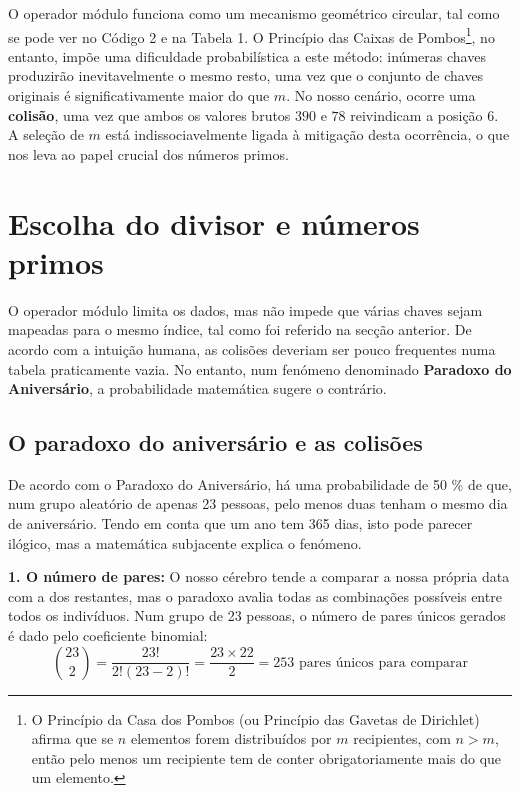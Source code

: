 \documentclass[12pt, a4paper]{article}
\begin{document}
O operador módulo funciona como um mecanismo geométrico circular, tal como se pode ver no 
Código 2 e na Tabela 1. O Princípio das Caixas de Pombos\footnote{O Princípio da Casa dos Pombos 
(ou Princípio das Gavetas de Dirichlet) afirma que se $n$ elementos forem distribuídos por $m$ recipientes, 
com $n > m$, então pelo menos um recipiente tem de conter obrigatoriamente mais do que um elemento.}, no entanto, 
impõe uma dificuldade probabilística a este método: inúmeras chaves produzirão inevitavelmente o mesmo resto, uma 
vez que o conjunto de chaves originais é significativamente maior do que $m$. No nosso cenário, 
ocorre uma \textbf{colisão}, uma vez que ambos os valores brutos $390$ e $78$ reivindicam a posição $6$. 
A seleção de $m$ está indissociavelmente ligada à mitigação desta ocorrência, o que nos leva ao papel crucial 
dos números primos.

\section{Escolha do divisor e números primos}
O operador módulo limita os dados, mas não impede que várias chaves sejam mapeadas para o 
mesmo índice, tal como foi referido na secção anterior. De acordo com a intuição humana, as colisões 
deveriam ser pouco frequentes numa tabela praticamente vazia. No entanto, num fenómeno denominado 
\textbf{Paradoxo do Aniversário}, a probabilidade matemática sugere o contrário.

\subsection{O paradoxo do aniversário e as colisões}
De acordo com o Paradoxo do Aniversário, há uma probabilidade de 50 \% de que, num grupo 
aleatório de apenas 23 pessoas, pelo menos duas tenham o mesmo dia de aniversário. Tendo em 
conta que um ano tem 365 dias, isto pode parecer ilógico, mas a matemática subjacente 
explica o fenómeno.

\textbf{1. O número de pares:} O nosso cérebro tende a comparar a nossa própria data com a dos 
restantes, mas o paradoxo avalia todas as combinações possíveis entre todos os indivíduos. 
Num grupo de 23 pessoas, o número de pares únicos gerados é dado pelo coeficiente binomial:
\begin{equation}
    \binom{23}{2} = \frac{23!}{2!(23-2)!} = \frac{23 \times 22}{2} = 253 \text{ pares únicos para comparar}
\end{equation}
\end{document}
